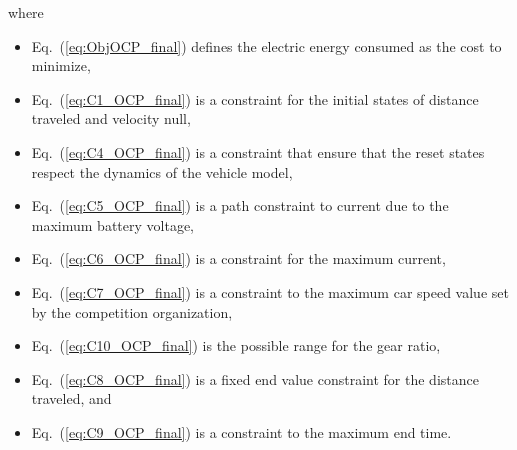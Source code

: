 \noindent where 

\begin{itemize}
    \item[ ] Eq.~(\ref{eq:ObjOCP_final}) defines the electric energy consumed as the cost to minimize,
    \item[ ] Eq.~(\ref{eq:C1_OCP_final}) is a constraint for the initial states of distance traveled and velocity null, 
    \item[ ] Eq.~(\ref{eq:C4_OCP_final}) is a constraint  that ensure that the reset states respect the dynamics of the vehicle model, 
    \item[ ] Eq.~(\ref{eq:C5_OCP_final}) is a path constraint to current due to the maximum battery voltage, 
    \item[ ] Eq.~(\ref{eq:C6_OCP_final}) is a constraint for the maximum current, 
    \item[ ] Eq.~(\ref{eq:C7_OCP_final}) is a constraint to the maximum car speed value set by the competition organization, 
    \item[ ] Eq.~(\ref{eq:C10_OCP_final}) is the possible range for the gear ratio, 
    \item[ ] Eq.~(\ref{eq:C8_OCP_final}) is a fixed end value constraint for the distance traveled, and 
    \item[ ] Eq.~(\ref{eq:C9_OCP_final}) is a constraint to the maximum end time.
  \end{itemize}

 

